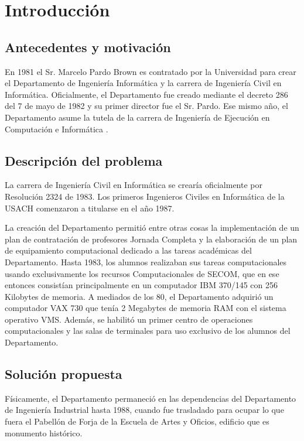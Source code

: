 \chapter{Introducci\'on}
\label{cap:introduccion}

\section{Antecedentes y motivaci\'on}
\label{intro:motivacion}
En 1981 el Sr. Marcelo Pardo Brown es contratado por la Universidad para crear el Departamento de Ingeniería Informática y la carrera de Ingeniería Civil en Informática. Oficialmente, el Departamento fue creado mediante el decreto 286 del 7 de mayo de 1982 y su primer director fue el Sr. Pardo. Ese mismo año, el Departamento asume la tutela de la carrera de Ingeniería de Ejecución en Computación e Informática \citep{Codishetal2000}.

\section{Descripci\'on del problema}
\label{intro:problema}
La carrera de Ingeniería Civil en Informática se crearía oficialmente por Resolución 2324 de 1983.  Los primeros Ingenieros Civiles en Informática de la USACH comenzaron a titularse en el año 1987.

La creación del Departamento permitió entre otras cosas la implementación de un plan de contratación de profesores Jornada Completa y la elaboración de un plan de equipamiento computacional dedicado a las tareas académicas del Departamento. Hasta 1983, los alumnos realizaban sus tareas computacionales usando exclusivamente los recursos Computacionales de SECOM, que en ese entonces consistían principalmente en un computador IBM 370/145 con 256 Kilobytes de memoria. A mediados de los 80, el Departamento adquirió un computador VAX 730 que tenía 2 Megabytes de memoria RAM con el sistema operativo VMS. Además, se habilitó un primer centro de operaciones computacionales y las salas de terminales para uso exclusivo de los alumnos del Departamento.


\section{Soluci\'on propuesta}
\label{intro:solucion}
Físicamente, el Departamento permaneció en las dependencias del Departamento de Ingeniería Industrial hasta 1988, cuando fue trasladado para ocupar lo que fuera el Pabellón de Forja de la Escuela de Artes y Oficios, edificio que es monumento histórico.

